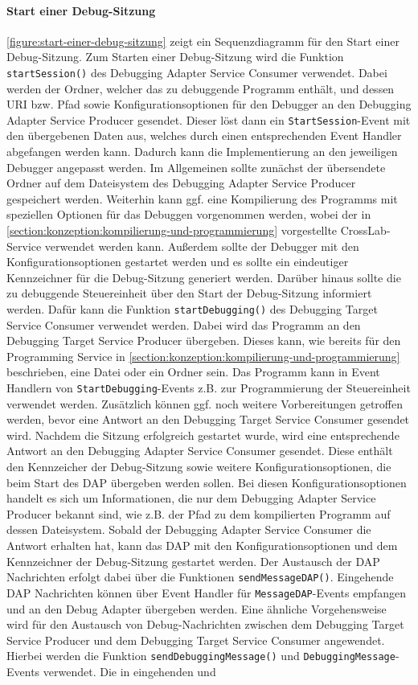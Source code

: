 \paragraph{Start einer Debug-Sitzung} \autoref{figure:start-einer-debug-sitzung} zeigt ein Sequenzdiagramm für den Start einer Debug-Sitzung. Zum Starten einer Debug-Sitzung wird die Funktion \texttt{startSession()} des Debugging Adapter Service Consumer verwendet. Dabei werden der Ordner, welcher das zu debuggende Programm enthält, und dessen URI bzw. Pfad sowie Konfigurationsoptionen für den Debugger an den Debugging Adapter Service Producer gesendet. Dieser löst dann ein \texttt{StartSession}-Event mit den übergebenen Daten aus, welches durch einen entsprechenden Event Handler abgefangen werden kann. Dadurch kann die Implementierung an den jeweiligen Debugger angepasst werden. Im Allgemeinen sollte zunächst der übersendete Ordner auf dem Dateisystem des Debugging Adapter Service Producer gespeichert werden. Weiterhin kann ggf. eine Kompilierung des Programms mit speziellen Optionen für das Debuggen vorgenommen werden, wobei der in \autoref{section:konzeption:kompilierung-und-programmierung} vorgestellte CrossLab-Service verwendet werden kann. Außerdem sollte der Debugger mit den Konfigurationsoptionen gestartet werden und es sollte ein eindeutiger Kennzeichner für die Debug-Sitzung generiert werden. Darüber hinaus sollte die zu debuggende Steuereinheit über den Start der Debug-Sitzung informiert werden. Dafür kann die Funktion \texttt{startDebugging()} des Debugging Target Service Consumer verwendet werden. Dabei wird das Programm an den Debugging Target Service Producer übergeben. Dieses kann, wie bereits für den Programming Service in \autoref{section:konzeption:kompilierung-und-programmierung} beschrieben, eine Datei oder ein Ordner sein. Das Programm kann in Event Handlern von \texttt{StartDebugging}-Events z.B. zur Programmierung der Steuereinheit verwendet werden. Zusätzlich können ggf. noch weitere Vorbereitungen getroffen werden, bevor eine Antwort an den Debugging Target Service Consumer gesendet wird. Nachdem die Sitzung erfolgreich gestartet wurde, wird eine entsprechende Antwort an den Debugging Adapter Service Consumer gesendet. Diese enthält den Kennzeicher der Debug-Sitzung sowie weitere Konfigurationsoptionen, die beim Start des \ac{DAP} übergeben werden sollen. Bei diesen Konfigurationsoptionen handelt es sich um Informationen, die nur dem Debugging Adapter Service Producer bekannt sind, wie z.B. der Pfad zu dem kompilierten Programm auf dessen Dateisystem. Sobald der Debugging Adapter Service Consumer die Antwort erhalten hat, kann das \ac{DAP} mit den Konfigurationsoptionen und dem Kennzeichner der Debug-Sitzung gestartet werden. Der Austausch der \ac{DAP} Nachrichten erfolgt dabei über die Funktionen \texttt{sendMessageDAP()}. Eingehende \ac{DAP} Nachrichten können über Event Handler für \texttt{MessageDAP}-Events empfangen und an den Debug Adapter übergeben werden. Eine ähnliche Vorgehensweise wird für den Austausch von Debug-Nachrichten zwischen dem Debugging Target Service Producer und dem Debugging Target Service Consumer angewendet. Hierbei werden die Funktion \texttt{sendDebuggingMessage()} und \texttt{DebuggingMessage}-Events verwendet. Die in eingehenden und 